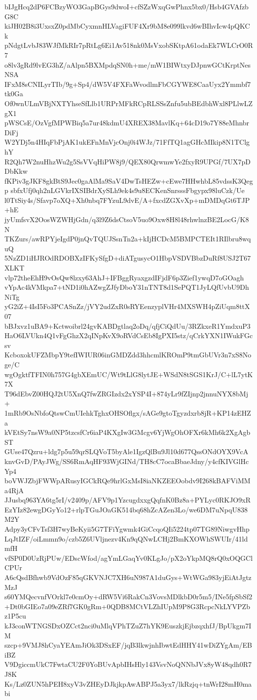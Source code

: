 bIJgHcq2dP6FCBzyWO3GapBGys9dwoI+cfSZzWxqGwPhnx5bx0/Hsb4GVAfzbG8C
kiJH02B8i3UxsxZ0pdMbCyxmnHLVagiFUF4Xr9bM8e099lkvd6wBIhvIcw4pQKCk
pNdgtLvbJ83WJfMkRIr7pRtLg6Ei1Av518nk0MsVxobSKtpA61odaEk7WLCrO0R7
o8lv3gRd9lvEG3hZ/aAlpn5BXMpdqSN0h+me/mW1BIWtxyDJpnwGCtKrptNesNSA
IFxM8sCNILyrTIb/9g+Sp4/dW5V4FXFaWvodlmFbCGYWE8CaaUyx2Ymmbf7tk0Ga
Of0wnULmVBjNXTYhseSfLlb1URPrMFkRCpRLSSsZnfu5ubBEdbhWxl8PLlwLZgX1
pWSCsE/OzVgfMPWBiq5a7ur48kdmU4XREX38MavlKq+64cD19o7Y88eMhnbrDiFj
W2YDj5n4HIqFbPjAK1ukEFnMnVjcOnj0i4WJz/71FfTQ1agGHcMIkip8N1TClghY
R2Qh7W2nuHhzWu2g5SsVVqHiPW8j9/QEX80QrwmwYe2fxyR9UPGf/7UX7pDDbKkw
fKPiv3gJKF8gkBtS9Jec0gaAlMa9SaV4DwTsHEZw+cEwe7HHwhbL85vdssK3Qegp
sbfxUfj0qh2nLGVkrIXSIBdrXySLh9ek4s9u8ECKenSnrsssFbgypx98luCzk/Ue
l0TtSiy4s/Sfavp7oXQ+Xh0nbq7FYzuL9dvE/A+fxcdZGXvXp+mDMDqGt6TJP+hE
jyUmfsvX2OosWZWHjGdn/q3l9Z6dsCtsoV5uo9Oxw8H8l48rhwlnzBE2LocG/K8N
TKZurs/awRPYjeIgdP0jnQvTQUJSsnTn2a+kIjHCDcM5BMPCTEIt1RIlbru8wquQ
5NzZD1iHJROdRDOBXzIFKySfgD+diATgusycO1HbpVSDVBbzDuRf8USJ2T67XLKT
vlp72theEhH9vOsQw8lzxy63AhJ+IFBggRyaxgzdIFjdF6p3Zief1ywqD7oGOagh
vYpAc4kVMkpa7+tND1i0hAZwgZJfyDboY31nTNT8d1SePQT1JyLQfUvbU9DhNiTg
yG2iZ+4IsI5Fo3PCASnZz/jVY2udZxR0sRYEenzyplVHr4MXSWH4pZiUqm8ttX07
bBJxvz1uBA9+Kctwoibrl24gvKABDgtlaq2oDq/qfjCiQdUu/3RZkxeR1YmdxuP3
HaO6LVUkn4Q1vFgGhzX2qINpKvX9oRVdCsEb8IgPXI5stz/qCrkYXN1IWukFGcsv
KcboxokUFZMbpY9tefIWIUR06inGMDZdd3hhcmlKROmP9tmGbUVr3n7xS8Noge/C
wgOgktfTFIN0h757G4gbXEmUC/Wt9tLlG8lytJE+WSdN8tSGS1KrJ/C+lL7ytK7X
T96dEbvZ00HQJ2tU5XnQ7fwZRGIzdx2xYSP4I+874yLr9fZIjnp2jnnuNYX8bMj+
1mRb9OsNbfoQtswCmUIehkTghxOHSOflgx/sAGe9gtoTgyzdxrb8jR+KP14zEHZa
kVEtSy7nsW9a0NP5tzcsfCr6iaP4KXgIw3GMcgv6YjWgOhOFXr6kMh6k2XgAgbST
GUse47Qzru+ldg7p5u59qrSLQVoT5byAle1IgzQlBu9Jl10d677QssONdOYX9VcA
knvGvD/PAyJWg/SS6RmAqHF93WjGINd/TH8cC7ocaBbaeJdny/y4cfKIVGlHcYp4
boVWJZbjFWWpARusyIGCkRQe9hrlGxMsI8iaNKZEEOobdv9I268kBAFViMMa4RjA
JJusbq963YA6tg5rI/v2409p/AFV9p1YzcugdxxgQqfnK0Bz8a+PYLyc0RKJO9xR
EzYIz82ewgDGyYo12+rlpTGuJOaGK514bq68hZcAZen3Lo/we6DM7uNpqU838M2Y
Adpy3yCFvTsf3H7wyBeKyii5G7TFiYgwmk4GiCcqoQIi5224tp07TG89NiwgvHhp
LqJtIZF/oiLmmn9o/czb5Z6UVljnezv4Kn9qQNwLCHj2BmKXOWhSWUIr/41ldmfH
vfSP0D0UzRjPUw/EDscWfod/agYmLGaqYv0KLgJo/pX2oYkpMQ8rQ0xOQGClCPUr
A6cQsdBfhwb9VdOzF85qGKVNJC7XH6uN987A1duGys+WtWGa983yjEiAtJgtzMzJ
s60YMQecvnfVOrkl7e0cmOy+dRW5Vi6RakCn3VovsMDlkbD0r5m5/INe5fpSbSf2
+Dt0bGIEo7a09eZRf7GK0gRm+0QDB8MCtVLZhIUpM9P8G3RcpcNkLYVPZbz1P5cu
kJ3conWTNGSDxOZCct2nci0uMlqVPhTZuZ7hYK9EuszkjEjbzqxhfJ/BpUkgm7IM
szcp+9VMJ8hCyaYEAmJiOk3DSxEF/jqB3lkwjnhIbwtEdHHY41wDiZYgAm/EBiBZ
V9DgiccmUkC7FwtaCU2F0YoBUvApbIHsHly143VsvNoQNNbJVx8yW48qdh0R7J8K
Ks/Lz0ZUN5hPEH8xyV3vZHEyDJkjkpAwABPJ5a3yx7/lkRzjq+tnWrI28mH0mabi
